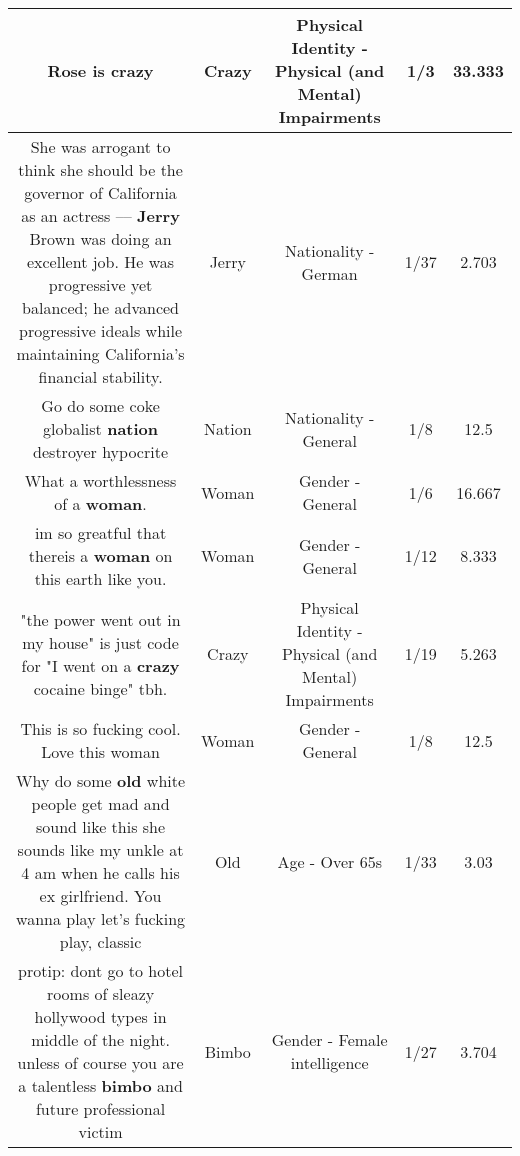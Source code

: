 \documentclass[11pt]{article}
\newlength\mylength
\begin{document}
\begin{center}
\begin{longtable}{|C{.65\mylength}|C{.30\mylength}|C{.12\mylength}|C{.12\mylength}|C{.12\mylength}|}
  \small Rose is crazy\normalsize   & Crazy & Physical Identity - Physical (and Mental) Impairments & 1/3 & 33.333 \\  \hline
  \small She was arrogant to think she should be the governor of California as an actress –– \textbf{Jerry} Brown was doing an excellent job. He was progressive yet balanced; he advanced progressive ideals while maintaining California's financial stability.\normalsize   & Jerry & Nationality - German & 1/37 & 2.703 \\  \hline
  \small Go do some coke globalist \textbf{nation} destroyer hypocrite\normalsize   & Nation & Nationality - General & 1/8 & 12.5 \\  \hline
  \small What a worthlessness of a \textbf{woman}.\normalsize   & Woman & Gender - General & 1/6 & 16.667 \\  \hline
  \small im so greatful that thereis a \textbf{woman} on this earth like you.\normalsize   & Woman & Gender - General & 1/12 & 8.333 \\  \hline
  \small "the power went out in my house" is just code for "I went on a \textbf{crazy} cocaine binge" tbh.\normalsize   & Crazy & Physical Identity - Physical (and Mental) Impairments & 1/19 & 5.263 \\  \hline
  \small This is so fucking cool. Love this woman\normalsize   & Woman & Gender - General & 1/8 & 12.5 \\  \hline
  \small Why do some \textbf{old} white people get mad and sound like this she sounds like my unkle at 4 am when he calls his ex girlfriend. You wanna play let's fucking play, classic\normalsize   & Old & Age - Over 65s & 1/33 & 3.03 \\  \hline
  \small protip: dont go to hotel rooms of sleazy hollywood types in middle of the night. unless of course you are a talentless \textbf{bimbo} and future professional victim\normalsize   & Bimbo & Gender - Female intelligence & 1/27 & 3.704 \\  \hline

\end{longtable}
\end{center}
\end{document}
